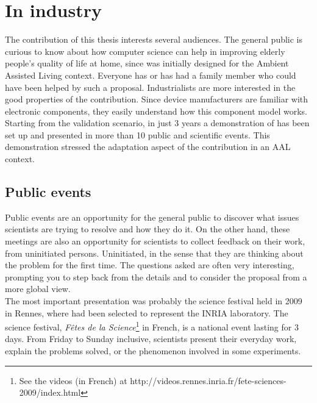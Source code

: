 \section{In industry}
\label{ch:industrialPerspectives}

The contribution of this thesis interests several audiences. The general public is curious to know about how computer science can help in improving elderly people's quality of life at home, since \enti{} was initially designed for the Ambient Assisted Living context. Everyone has or has had a family member who could have been helped by such a proposal. Industrialists are more interested in the good properties of the contribution. Since device manufacturers are familiar with electronic components, they easily understand how this component model works.\\
Starting from the validation scenario, in just 3 years a demonstration of \enti{} has been set up and presented in more than 10 public and scientific events. This demonstration stressed the adaptation aspect of the contribution in an AAL context.

\subsection{Public events}

Public events are an opportunity for the general public to discover what issues scientists are trying to resolve and how they do it. On the other hand, these meetings are also an opportunity for scientists to collect feedback on their work, from uninitiated persons. Uninitiated, in the sense that they are thinking about the problem for the first time. The questions asked are often very interesting, prompting you to step back from the details and to consider the proposal from a more global view.\\

The most important presentation was probably the science festival held in 2009 in Rennes, where \enti{} had been selected to represent the INRIA laboratory. The science festival, {\it Fêtes de la Science}\footnote{See the videos (in French) at http://videos.rennes.inria.fr/fete-sciences-2009/index.html} in French, is a national event lasting for 3 days. From Friday to Sunday inclusive, scientists present their everyday work, explain the problems solved, or the phenomenon involved in some experiments.

